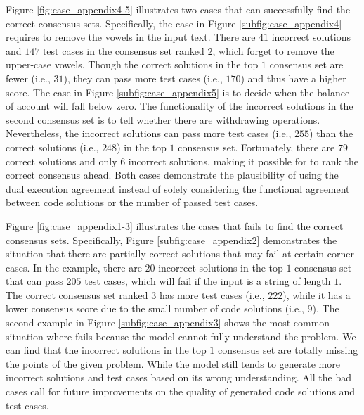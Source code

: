 Figure \ref{fig:case_appendix4-5} illustrates two cases that \ours can successfully find the correct consensus sets. Specifically, the case in Figure \ref{subfig:case_appendix4} requires to remove the vowels in the input text. There are $41$ incorrect solutions and $147$ test cases in the consensus set ranked $2$, which forget to remove the upper-case vowels. Though the correct solutions in the top $1$ consensus set are fewer (i.e., $31$), they can pass more test cases (i.e., $170$) and thus have a higher score. The case in Figure \ref{subfig:case_appendix5} is to decide when the balance of account will fall below zero. The functionality of the incorrect solutions in the second consensus set is to tell whether there are withdrawing operations. Nevertheless, the incorrect solutions can pass more test cases (i.e., $255$) than the correct solutions (i.e., $248$) in the top $1$ consensus set. Fortunately, there are $79$ correct solutions and only $6$ incorrect solutions, making it possible for \ours to rank the correct consensus ahead. Both cases demonstrate the plausibility of using the dual execution agreement instead of solely considering the functional agreement between code solutions or the number of passed test cases.

Figure \ref{fig:case_appendix1-3} illustrates the cases that \ours fails to find the correct consensus sets. Specifically, Figure \ref{subfig:case_appendix2} demonstrates the situation that there are partially correct solutions that may fail at certain corner cases. In the example, there are $20$ incorrect solutions in the top $1$ consensus set that can pass $205$ test cases, which will fail if the input is a string of length $1$. The correct consensus set ranked $3$ has more test cases (i.e., $222$), while it has a lower consensus score due to the small number of code solutions (i.e., $9$). The second example in Figure \ref{subfig:case_appendix3} shows the most common situation where \ours fails because the model cannot fully understand the problem. We can find that the incorrect solutions in the top $1$ consensus set are totally missing the points of the given problem. While the model still tends to generate more incorrect solutions and test cases based on its wrong understanding. All the bad cases call for future improvements on the quality of generated code solutions and test cases.


